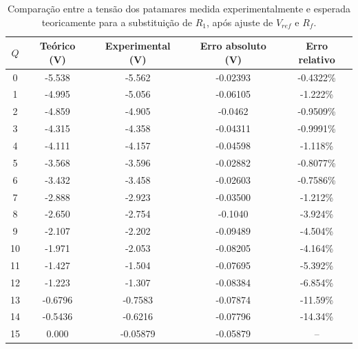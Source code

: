 \documentclass[a4paper, oneside]{article}
\begin{document}
\begin{table}[ht]
	\centering
	\caption{Comparação entre a tensão dos patamares medida experimentalmente e esperada teoricamente para a substituição de $R_1$, após ajuste de $V_{ref}$ e $R_f$.}
	\label{tab:Pat_R1_exp_Aj}
	\begin{tabular}{ccccc}
		$Q$ & Teórico (V) & Experimental (V) & Erro absoluto (V) & Erro relativo\\
		\hline
		0 & -5.538 & -5.562 & -0.02393 & -0.4322\%\\ 
		1 & -4.995 & -5.056 & -0.06105 & -1.222\%\\ 
		2 & -4.859 & -4.905 & -0.0462 & -0.9509\%\\ 
		3 & -4.315 & -4.358 & -0.04311 & -0.9991\%\\ 
		4 & -4.111 & -4.157 & -0.04598 & -1.118\%\\ 
		5 & -3.568 & -3.596 & -0.02882 & -0.8077\%\\ 
		6 & -3.432 & -3.458 & -0.02603 & -0.7586\%\\ 
		7 & -2.888 & -2.923 & -0.03500 & -1.212\%\\ 
		8 & -2.650 & -2.754 & -0.1040 & -3.924\%\\ 
		9 & -2.107 & -2.202 & -0.09489 & -4.504\%\\ 
		10 & -1.971 & -2.053 & -0.08205 & -4.164\%\\ 
		11 & -1.427 & -1.504 & -0.07695 & -5.392\%\\ 
		12 & -1.223 & -1.307 & -0.08384 & -6.854\%\\ 
		13 & -0.6796 & -0.7583 & -0.07874 & -11.59\%\\ 
		14 & -0.5436 & -0.6216 & -0.07796 & -14.34\%\\ 
		15 & 0.000 & -0.05879 & -0.05879 & --\\
	

		\hline
	\end{tabular}
\end{table}
\end{document}
